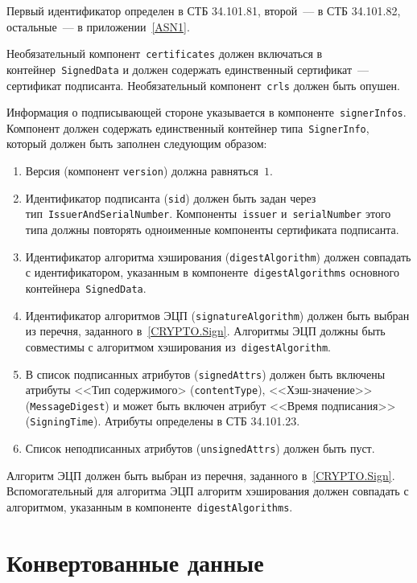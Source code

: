 Первый идентификатор определен в СТБ 34.101.81, второй~--- в СТБ 
34.101.82, остальные~--- в приложении~\ref{ASN1}.

Необязательный компонент~\texttt{certificates}
должен включаться в контейнер~\texttt{SignedData} и должен 
содержать единственный сертификат~--- сертификат подписанта.
%
Необязательный компонент~\texttt{crls} должен быть опушен.

Информация о подписывающей стороне указывается в 
компоненте~\texttt{signerInfos}. Компонент должен содержать единственный 
контейнер типа~\texttt{SignerInfo}, который должен быть заполнен следующим 
образом: 
\begin{enumerate}
\item 
Версия (компонент \texttt{version}) должна равняться~$1$.
\item 
Идентификатор подписанта (\texttt{sid}) должен быть задан через
тип~\texttt{IssuerAndSerialNumber}. Компоненты~\texttt{issuer} 
и~\texttt{serialNumber} этого типа должны повторять одноименные компоненты 
сертификата подписанта.
\item 
Идентификатор алгоритма хэширования (\texttt{digestAlgorithm}) должен 
совпадать с идентификатором, указанным в 
компоненте~\texttt{digestAlgorithms} основного 
контейнера~\texttt{SignedData}. 
\item 
Идентификатор алгоритмов ЭЦП (\texttt{signatureAlgorithm}) должен 
быть выбран из перечня, заданного в~\ref{CRYPTO.Sign}. 
Алгоритмы ЭЦП должны быть совместимы с алгоритмом хэширования 
из~\texttt{digestAlgorithm}.
\item 
В список подписанных атрибутов (\texttt{signedAttrs}) должен 
быть включены атрибуты <<Тип содержимого> (\texttt{contentType}),
<<Хэш-значение>> (\texttt{MessageDigest}) и может быть включен
атрибут <<Время подписания>> (\texttt{SigningTime}). 
Атрибуты определены в СТБ 34.101.23.
\item 
Список неподписанных атрибутов (\texttt{unsignedAttrs}) должен быть пуст.
\end{enumerate}

Алгоритм ЭЦП должен быть выбран из перечня, заданного в~\ref{CRYPTO.Sign}. 
Вспомогательный для алгоритма ЭЦП алгоритм хэширования должен
совпадать с алгоритмом, указанным в компоненте~\texttt{digestAlgorithms}. 

\section{Конвертованные данные}\label{FMT.EnvelopedData}

